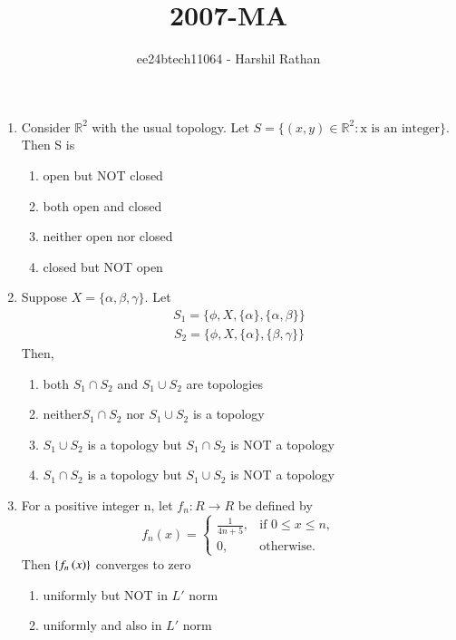 \documentclass[journal,12pt,twocolumn]{IEEEtran}
\theoremstyle{remark}
\begin{document}

\vspace{3cm}

\title{2007-MA}
\author{ee24btech11064 - Harshil Rathan}
\maketitle
\newpage
\bigskip

\renewcommand{\thefigure}{\theenumi}
\renewcommand{\thetable}{\theenumi}
\begin{enumerate}
\item Consider $\mathbb{R}^2$ with the usual topology. Let $S=\{(x,y)\in \mathbb{R}^2:\text{x is an integer}\}$. Then S is 
\begin{enumerate}
    \item open but NOT closed 
    \item  both open and closed
    \item  neither open nor closed
    \item  closed but NOT open
\end{enumerate}
\item Suppose $X=\{\alpha,\beta,\gamma\}$. Let
\begin{align*}
    S_1=\{\phi,X,\{\alpha\},\{\alpha,\beta\}\} 
\end{align*}
\begin{align*}
    S_2=\{\phi,X,\{\alpha\},\{\beta,\gamma\}\} 
\end{align*}
Then,
\begin{enumerate}
    \item both $S_1 \cap S_2$ and $S_1\cup S_2$ are topologies
    \item neither$S_1 \cap S_2$ nor $S_1\cup S_2$ is a topology
    \item $S_1\cup S_2$ is a topology but $S_1 \cap S_2$ is NOT a topology
    \item $S_1 \cap S_2$ is a topology but $S_1\cup S_2$ is NOT a topology
\end{enumerate}
\item For a positive integer n, let $f_n:R\rightarrow R$ be defined by
\[
f_n(x) = \begin{cases}
\frac{1}{4n+5}, & \text{if } 0 \leq x \leq n, \\
0, & \text{otherwise.}
\end{cases}
\]
Then $\{f_n\left(x\right)\}$ converges to zero
\begin{enumerate}
       \item uniformly but NOT in $L'$ norm
       \item uniformly and also in $L'$ norm

\end{enumerate}
\end{enumerate}
\end{document}
